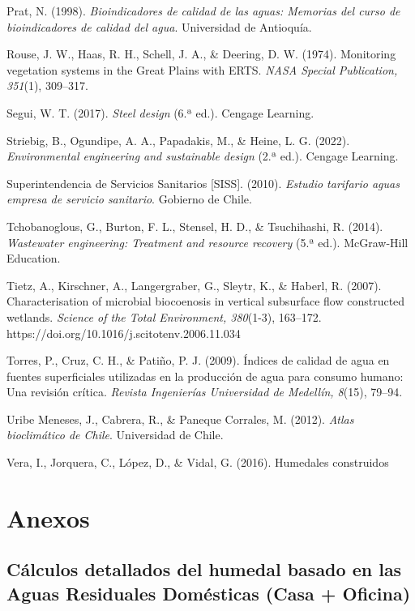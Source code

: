 \documentclass[12pt, letterpaper]{report}
\begin{document}
Prat, N. (1998). \textit{Bioindicadores de calidad de las aguas: Memorias del curso de bioindicadores de calidad del agua}. Universidad de Antioquía.

Rouse, J. W., Haas, R. H., Schell, J. A., \& Deering, D. W. (1974). Monitoring vegetation systems in the Great Plains with ERTS. \textit{NASA Special Publication, 351}(1), 309--317.

Segui, W. T. (2017). \textit{Steel design} (6.ª ed.). Cengage Learning.

Striebig, B., Ogundipe, A. A., Papadakis, M., \& Heine, L. G. (2022). \textit{Environmental engineering and sustainable design} (2.ª ed.). Cengage Learning.

Superintendencia de Servicios Sanitarios [SISS]. (2010). \textit{Estudio tarifario aguas empresa de servicio sanitario}. Gobierno de Chile.

Tchobanoglous, G., Burton, F. L., Stensel, H. D., \& Tsuchihashi, R. (2014). \textit{Wastewater engineering: Treatment and resource recovery} (5.ª ed.). McGraw-Hill Education.

Tietz, A., Kirschner, A., Langergraber, G., Sleytr, K., \& Haberl, R. (2007). Characterisation of microbial biocoenosis in vertical subsurface flow constructed wetlands. \textit{Science of the Total Environment, 380}(1-3), 163--172. https://doi.org/10.1016/j.scitotenv.2006.11.034

Torres, P., Cruz, C. H., \& Patiño, P. J. (2009). Índices de calidad de agua en fuentes superficiales utilizadas en la producción de agua para consumo humano: Una revisión crítica. \textit{Revista Ingenierías Universidad de Medellín, 8}(15), 79--94.

Uribe Meneses, J., Cabrera, R., \& Paneque Corrales, M. (2012). \textit{Atlas bioclimático de Chile}. Universidad de Chile.

Vera, I., Jorquera, C., López, D., \& Vidal, G. (2016). Humedales construidos

\endgroup

\appendix
\chapter{Anexos}

\section{Cálculos detallados del humedal basado en las Aguas Residuales Domésticas (Casa + Oficina)}
\label{anexo:calculos_humedal}
\end{document}
